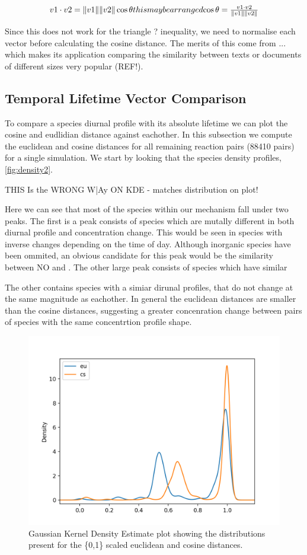 \begin{equation}
v1 \cdot v2 = \|v1\|\|v2\| \cos \theta
$$this may be arranged$$
\cos \theta = \frac{ v1 \cdot v2}{\|v1\|\|v2\|}
\end{equation}

Since this does not work for the triangle ? inequality, we need to normalise each vector before calculating the cosine distance. The merits of this come from  ... which makes its application comparing the similarity between texts or documents of different sizes very popular (REF!). \\



\subsection{Temporal Lifetime Vector Comparison}

To compare a species diurnal profile with its absolute lifetime we can plot the cosine and eudlidian distance against eachother. In this subsection we compute the euclidean and cosine distances for all remaining reaction pairs (88410 pairs) for a single simulation. We start by looking that the species density profiles, \autoref{fig:density2}.

THIS Is the WRONG W|Ay ON KDE - matches distribution on plot!

Here we can see that most of the species within our mechanism fall under two peaks. The first is a peak consists of species which are mutally different in both diurnal profile and concentration change. This would be seen in species with inverse changes depending on the time of day. Although inorganic species have been ommited, an obvious candidate for this peak would be the similarity between NO and . The other large peak consists of species which have similar


 The other contains species with a simiar dirunal profiles, that do not change at the same magnitude as eachother. In general the euclidean distances are smaller than the cosine distances, suggesting a greater concenration change between pairs of species with the same concentrtion profile shape.




\begin{figure}[H]
    \centering
\includegraphics[width=.7\textwidth]{fig/metric_density.png}
\caption{Gaussian Kernel Density Estimate plot showing the distributions present for the \{0,1\} scaled euclidean and cosine distances.}
\label{fig:density2}
\end{figure}


